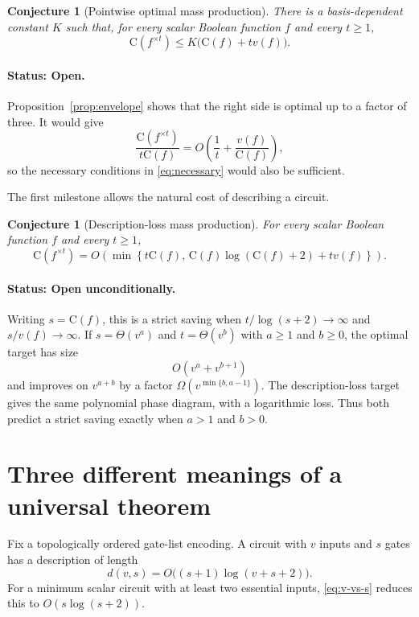 \documentclass[11pt]{article}
\newtheorem{conjecture}[theorem]{Conjecture}
\theoremstyle{definition}
\newcommand{\C}{\mathrm{C}}
\newcommand{\open}{\textcolor{BrickRed}{\textbf{Open}}}
\begin{document}
\begin{conjecture}[Pointwise optimal mass production]
\label{conj:optimal}
There is a basis-dependent constant $K$ such that, for every scalar Boolean
function $f$ and every $t\ge1$,
\begin{equation}
  \C(f^{\times t})\le K\bigl(\C(f)+t v(f)\bigr).
  \label{eq:optimal-target}
\end{equation}
\end{conjecture}

\paragraph{Status: \open.}
Proposition~\ref{prop:envelope} shows that the right side is optimal up to a
factor of three.  It would give
\[
 \frac{\C(f^{\times t})}{t\C(f)}
   =O\!\left(\frac1t+\frac{v(f)}{\C(f)}\right),
\]
so the necessary conditions in \eqref{eq:necessary} would also be sufficient.

The first milestone allows the natural cost of describing a circuit.

\begin{conjecture}[Description-loss mass production]
\label{conj:description}
For every scalar Boolean function $f$ and every $t\ge1$,
\begin{equation}
 \C(f^{\times t})
 =O\!\left(\min\left\{t\C(f),\,
 \C(f)\log(\C(f)+2)+t v(f)\right\}\right).
 \label{eq:description-target}
\end{equation}
\end{conjecture}

\paragraph{Status: \open{} unconditionally.}
Writing $s=\C(f)$, this is a strict saving when
$t/\log(s+2)\to\infty$ and $s/v(f)\to\infty$.  If
$s=\Theta(v^a)$ and $t=\Theta(v^b)$ with $a\ge1$ and $b\ge0$, the optimal
target has size
\[
 O(v^a+v^{b+1})
\]
and improves on $v^{a+b}$ by a factor
$\Omega(v^{\min\{b,a-1\}})$.  The description-loss target gives the same
polynomial phase diagram, with a logarithmic loss.  Thus both predict a
strict saving exactly when $a>1$ and $b>0$.

\section{Three different meanings of a universal theorem}
\label{sec:strengths}

Fix a topologically ordered gate-list encoding.  A circuit with $v$ inputs
and $s$ gates has a description of length
\begin{equation}
 d(v,s)=O\bigl((s+1)\log(v+s+2)\bigr).
 \label{eq:description-length}
\end{equation}
For a minimum scalar circuit with at least two essential inputs,
\eqref{eq:v-vs-s} reduces this to $O(s\log(s+2))$.
\end{document}
